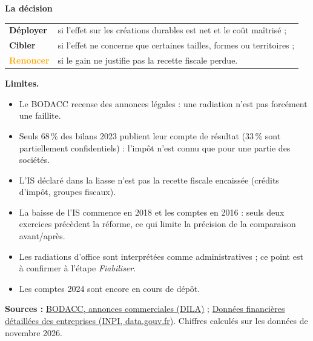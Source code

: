 \documentclass[11pt,a4paper]{article}
\begin{document}
\begin{encadre}
\textbf{La décision}\par\vspace{0.2em}
\begin{tabular}{@{}l@{\quad}l@{}}
\textcolor{sarcelle}{\textbf{Déployer}} & si l'effet sur les créations durables est net et le coût maîtrisé ;\\
\textcolor{bleu}{\textbf{Cibler}} & si l'effet ne concerne que certaines tailles, formes ou territoires ;\\
\textcolor{orange}{\textbf{Renoncer}} & si le gain ne justifie pas la recette fiscale perdue.
\end{tabular}
\end{encadre}

\textbf{Limites.}
\begin{itemize}[itemsep=0pt, parsep=0pt]
  \item Le BODACC recense des annonces légales : une radiation n'est pas forcément une faillite.
  \item Seuls 68\,\% des bilans 2023 publient leur compte de résultat (33\,\% sont partiellement confidentiels) :
        l'impôt n'est connu que pour une partie des sociétés.
  \item L'IS déclaré dans la liasse n'est pas la recette fiscale encaissée (crédits d'impôt, groupes fiscaux).
  \item La baisse de l'IS commence en 2018 et les comptes en 2016 : seuls deux exercices précèdent la réforme,
        ce qui limite la précision de la comparaison avant/après.
  \item Les radiations d'office sont interprétées comme administratives ; ce point est à confirmer à l'étape \emph{Fiabiliser}.
  \item Les comptes 2024 sont encore en cours de dépôt.
\end{itemize}

\vfill
{\footnotesize\color{gris}\textbf{Sources :}
\href{https://www.bodacc.fr/explore/dataset/annonces-commerciales/}{BODACC, annonces commerciales (DILA)} ;
\href{https://www.data.gouv.fr/datasets/donnees-financieres-detaillees-des-entreprises-format-parquet}{Données financières détaillées des entreprises (INPI, data.gouv.fr)}.
Chiffres calculés sur les données de novembre 2026.}
\end{document}
